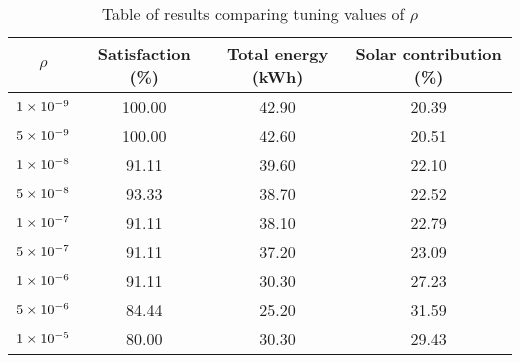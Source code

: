\begin{table}
   \centering
   \begin{tabular}{c c c c}
      $\rho$ & Satisfaction (\%) & Total energy (kWh) & Solar contribution (\%) \\ \hline
      $1\times 10^{-9}$ & 100.00 & 42.90 & 20.39 \\
      $5\times 10^{-9}$ & 100.00 & 42.60 & 20.51 \\
      $1\times 10^{-8}$ & 91.11 & 39.60 & 22.10 \\
      $5\times 10^{-8}$ & 93.33 & 38.70 & 22.52 \\
      $1\times 10^{-7}$ & 91.11 & 38.10 & 22.79 \\
      $5\times 10^{-7}$ & 91.11 & 37.20 & 23.09 \\
      $1\times 10^{-6}$ & 91.11 & 30.30 & 27.23 \\
      $5\times 10^{-6}$ & 84.44 & 25.20 & 31.59 \\
      $1\times 10^{-5}$ & 80.00 & 30.30 & 29.43 \\
   \end{tabular}
   \caption{Table of results comparing tuning values of $\rho$}
   \label{tab:rho}
\end{table}
